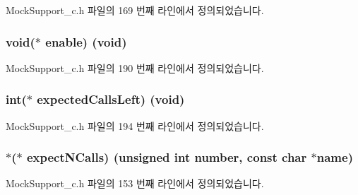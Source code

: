 Mock\+Support\+\_\+c.\+h 파일의 169 번째 라인에서 정의되었습니다.

\subsubsection[{\texorpdfstring{enable}{enable}}]{\setlength{\rightskip}{0pt plus 5cm}void($\ast$ enable) (void)}\hypertarget{struct_s_mock_support__c_a1642c82ad61ded45b6a55d568274bc10}{}\label{struct_s_mock_support__c_a1642c82ad61ded45b6a55d568274bc10}


Mock\+Support\+\_\+c.\+h 파일의 190 번째 라인에서 정의되었습니다.

\subsubsection[{\texorpdfstring{expected\+Calls\+Left}{expectedCallsLeft}}]{\setlength{\rightskip}{0pt plus 5cm}int($\ast$ expected\+Calls\+Left) (void)}\hypertarget{struct_s_mock_support__c_a9c8c00b9ab9d35951a17ebb5b8976bc5}{}\label{struct_s_mock_support__c_a9c8c00b9ab9d35951a17ebb5b8976bc5}


Mock\+Support\+\_\+c.\+h 파일의 194 번째 라인에서 정의되었습니다.

\subsubsection[{\texorpdfstring{expect\+N\+Calls}{expectNCalls}}]{$\ast$($\ast$ expect\+N\+Calls) (unsigned int number, const char $\ast$name)}\hypertarget{struct_s_mock_support__c_a31e99a1a522bc74f1a85d5ed0298e40a}{}\label{struct_s_mock_support__c_a31e99a1a522bc74f1a85d5ed0298e40a}


Mock\+Support\+\_\+c.\+h 파일의 153 번째 라인에서 정의되었습니다.


